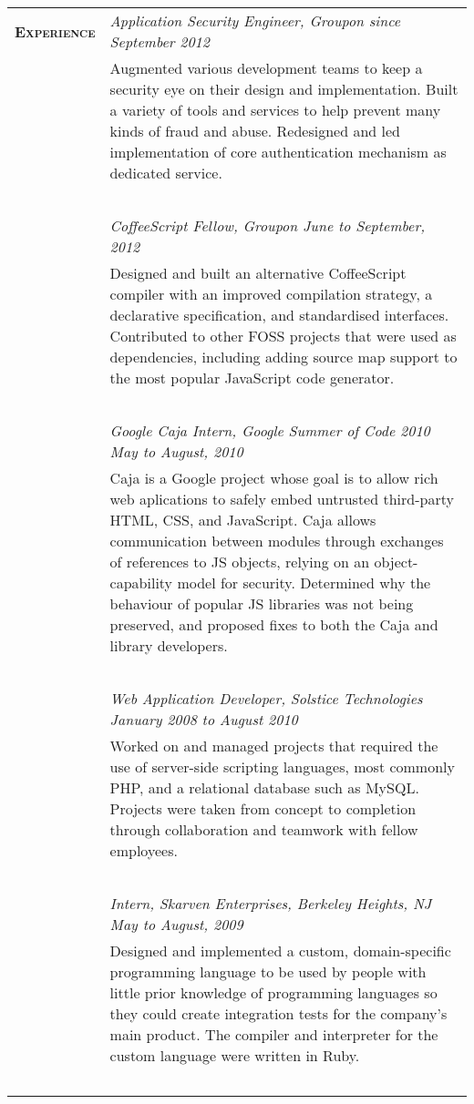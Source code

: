 \documentclass{report}
\newcommand{\sectiontitle}[1]{{\textsc{\textbf{#1}}}}
\newcommand{\gutterwidth}[0]{3.0cm}
\begin{document}
\begin{tabular}{@{}p{\gutterwidth}p{14cm}@{}}
  \sectiontitle{Experience}
      &  {\em Application Security Engineer, Groupon \hfill since September 2012} \\
  {}  &  Augmented various development teams to keep a security eye on their design and implementation. Built a variety
  of tools and services to help prevent many kinds of fraud and abuse. Redesigned and led implementation of core
  authentication mechanism as dedicated service.
  \\~\\
      &  {\em CoffeeScript Fellow, Groupon \hfill June to September, 2012} \\
  {}  &  Designed and built an alternative CoffeeScript compiler with an improved compilation strategy, a declarative
  specification, and standardised interfaces. Contributed to other FOSS projects that were used as dependencies,
  including adding source map support to the most popular JavaScript code generator.
  \\~\\
      &  {\em Google Caja Intern, Google Summer of Code 2010 \hfill May to August, 2010} \\
  {}  &  Caja is a Google project whose goal is to allow rich web aplications to safely embed untrusted third-party
  HTML, CSS, and JavaScript. Caja allows communication between modules through exchanges of references to JS
  objects, relying on an object-capability model for security. Determined why the behaviour of popular JS libraries
  was not being preserved, and proposed fixes to both the Caja and library developers.
  \\~\\
  {}  &  {\em Web Application Developer, Solstice Technologies \hfill January 2008 to August 2010} \\
  {}  &  Worked on and managed projects that required the use of server-side scripting languages, most commonly PHP, and
  a relational database such as MySQL\@. Projects were taken from concept to completion through collaboration and teamwork
  with fellow employees.
  \\~\\
  {}  &  {\em Intern, Skarven Enterprises, Berkeley Heights, NJ \hfill May to August, 2009} \\
  {}  &  Designed and implemented a custom, domain-specific programming language to be used by people with little prior
  knowledge of programming languages so they could create integration tests for the company's main product. The compiler
  and interpreter for the custom language were written in Ruby.
  \\~\\
\end{tabular}
\end{document}

